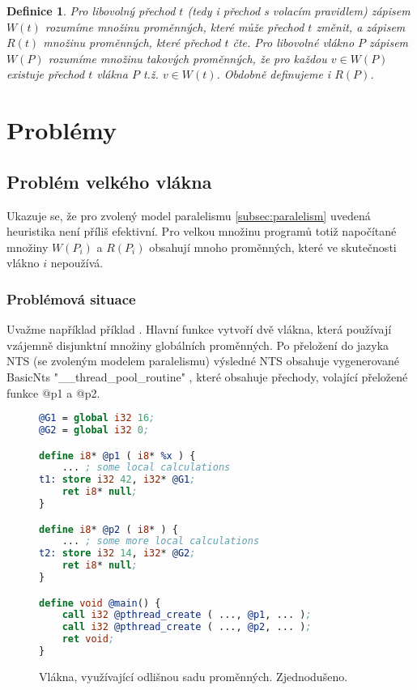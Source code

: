 \documentclass[10pt,a4paper,notitlepage]{report}
\newtheorem{definition}{Definice}
\begin{document}
\begin{definition}
Pro libovolný přechod $t$ (tedy i přechod s volacím pravidlem) zápisem $W(t)$ rozumíme množinu proměnných, které může přechod $t$ změnit, a zápisem $R(t)$ množinu proměnných, které přechod $t$ čte. Pro libovolné vlákno $P$ zápisem $W(P)$ rozumíme množinu takových proměnných, že pro každou $v \in W(P)$ existuje přechod $t$ vlákna $P$ t.ž. $v \in W(t)$. Obdobně definujeme i $R(P)$.
\end{definition}

\section{Problémy}

\subsection{Problém velkého vlákna}
Ukazuje se, že pro zvolený model paralelismu \ref{subsec:paralelism} uvedená heuristika není příliš efektivní. Pro velkou množinu programů  totiž napočítané množiny $W(P_i)$ a $R(P_i)$ obsahují mnoho proměnných, které ve skutečnosti vlákno $i$ nepoužívá.


\subsubsection{Problémová situace}
Uvažme například příklad . Hlavní funkce vytvoří dvě vlákna, která používají vzájemně disjunktní množiny globálních proměnných. Po přeložení do jazyka NTS (se zvoleným modelem paralelismu) výsledné NTS obsahuje vygenerované BasicNts "__thread_pool_routine" , které obsahuje přechody, volající přeložené funkce @p1 a @p2.
\begin{figure}[h!]
\begin{lstlisting}[language=llvm]
@G1 = global i32 16;
@G2 = global i32 0;

define i8* @p1 ( i8* %x ) {
	... ; some local calculations
t1:	store i32 42, i32* @G1;
	ret i8* null;
}

define i8* @p2 ( i8* ) {
	... ; some more local calculations
t2:	store i32 14, i32* @G2;
	ret i8* null;
}

define void @main() {
	call i32 @pthread_create ( ..., @p1, ... );
	call i32 @pthread_create ( ..., @p2, ... );
	ret void;
}
\end{lstlisting}
\caption{Vlákna, využívající odlišnou sadu proměnných. Zjednodušeno.}
\end{figure}
\end{document}

